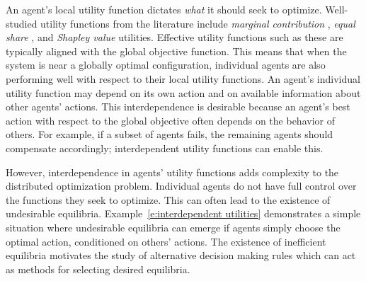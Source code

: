 
An agent's local utility function dictates {\it what} it should seek to optimize. Well-studied utility functions from the literature include {\it marginal contribution} \cite{Wolpert1999}, {\it equal share} \cite{Arslan2007, Marden2008}, and {\it Shapley value} \cite{Shapley1964} utilities. Effective utility functions such as these are typically aligned with the global objective function. This means that when the system is near a globally optimal configuration, individual agents are also performing well with respect to their local utility functions.  An agent's individual utility function may depend on its own action and on available information about other agents' actions. This interdependence is desirable because an agent's best action with respect to the global objective often depends on the behavior of others. For example, if a subset of agents fails, the remaining agents should compensate accordingly; interdependent utility functions can enable this.

However, interdependence in agents' utility functions adds complexity to the distributed optimization problem. Individual agents do not have full control over the functions they seek to optimize. This can often lead to the existence of undesirable equilibria. Example~\ref{e:interdependent utilities} demonstrates a simple situation where undesirable equilibria can emerge if agents simply choose the optimal action, conditioned on others' actions.
The existence of inefficient equilibria motivates the study of alternative decision making rules which can act as methods for selecting desired equilibria.

